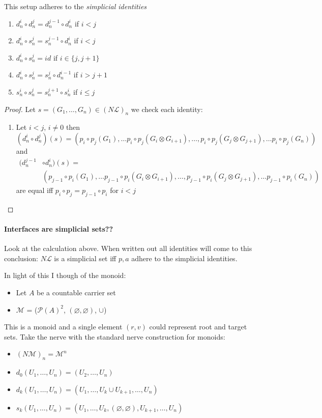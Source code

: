 \documentclass[12pt]{article}
\renewcommand{\P}{\mathcal{P}}
\newcommand{\1}{\mathbbm{1}}
\renewcommand{\L}{\mathcal{L}}
\newcommand{\M}{\mathcal{M}}
\begin{document}
This setup adheres to the \emph{simplicial identities}
\begin{enumerate}
    \item $d_n^i\circ d_n^j = d_n^{j-1}\circ d_n^i$ if $i < j$
    \item $d_n^i\circ s_n^j = s_n^{j-1}\circ d_n^i$ if $i < j$
    \item $d_n^i\circ s_n^j = id$ if $i \in \{j, j+1\}$
    \item $d_n^i\circ s_n^j = s_n^j\circ d_n^{i-1}$ if $i > j + 1$
    \item $s_n^i\circ s_n^j = s_n^{j+1}\circ s_n^i$ if $i\leq j$
\end{enumerate}

\begin{proof}
    Let $s = (G_1, \dots, G_n)\in (N\L)_n$ we check each identity:
    \begin{enumerate}
        \item Let $i < j$, $i \neq 0$ then $$(d_n^i\circ d_n^j)(s) = (p_i\circ p_j(G_1), \dots p_i\circ p_j(G_i \otimes G_{i+1}), \dots, p_i\circ p_j(G_j \otimes G_{j+1}), \dots p_i\circ p_j(G_n))$$
        and
        \begin{align*}
            (d_n^{j-1}&\circ d_n^i)(s) =\\ 
            &(p_{j-1}\circ p_i(G_1), \dots p_{j-1}\circ p_i(G_i \otimes G_{i+1}), \dots, p_{j-1}\circ p_i(G_j \otimes G_{j+1}), \dots p_{j-1}\circ p_i(G_n))
        \end{align*}
        are equal iff $p_i\circ p_j = p_{j-1}\circ p_i$ for $i < j$
    \end{enumerate}
\end{proof}
\newpage
\paragraph{Interfaces are simplicial sets??}
Look at the calculation above. When written out all identities will come to this conclusion: $N\L$ is a simplicial set iff $p, a$ adhere to the simplicial identities.

In light of this I though of the monoid:
\begin{itemize}
    \item Let $A$ be a countable carrier set
    \item $\M$ = ($\P(A)^2$, $(\varnothing, \varnothing)$, $\cup$)
\end{itemize}

This is a monoid and a single element $(r, v)$ could represent root and target sets. Take the nerve with the standard nerve construction for monoids:
\begin{itemize}
    \item $(N\M)_n = \M^n$
    \item $d_0(U_1, \dots, U_n) = (U_2, \dots, U_n)$
    \item $d_k(U_1, \dots, U_n) = (U_1, \dots, U_k\cup U_{k+1}, \dots, U_n)$
    \item $s_k(U_1, \dots, U_n) = (U_1, \dots, U_k, (\varnothing, \varnothing), U_{k+1}, \dots,  U_n)$
\end{itemize}
\end{document}
